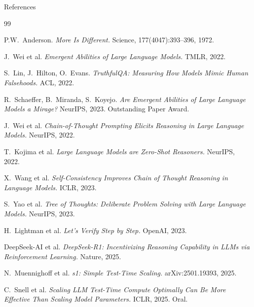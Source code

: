\documentclass[aspectratio=169, 12pt, xcolor=dvipsnames]{beamer}
\begin{document}
\begin{frame}[allowframebreaks]{References}
  \footnotesize
  \begin{thebibliography}{99}

    P.W.\ Anderson.
    \newblock \emph{More Is Different.}
    \newblock Science, 177(4047):393--396, 1972.

    J.\ Wei et al.
    \newblock \emph{Emergent Abilities of Large Language Models.}
    \newblock TMLR, 2022.

    S.\ Lin, J.\ Hilton, O.\ Evans.
    \newblock \emph{TruthfulQA: Measuring How Models Mimic Human Falsehoods.}
    \newblock ACL, 2022.

    R.\ Schaeffer, B.\ Miranda, S.\ Koyejo.
    \newblock \emph{Are Emergent Abilities of Large Language Models a Mirage?}
    \newblock NeurIPS, 2023. Outstanding Paper Award.

    J.\ Wei et al.
    \newblock \emph{Chain-of-Thought Prompting Elicits Reasoning in Large Language Models.}
    \newblock NeurIPS, 2022.

    T.\ Kojima et al.
    \newblock \emph{Large Language Models are Zero-Shot Reasoners.}
    \newblock NeurIPS, 2022.

    X.\ Wang et al.
    \newblock \emph{Self-Consistency Improves Chain of Thought Reasoning in Language Models.}
    \newblock ICLR, 2023.

    S.\ Yao et al.
    \newblock \emph{Tree of Thoughts: Deliberate Problem Solving with Large Language Models.}
    \newblock NeurIPS, 2023.

    H.\ Lightman et al.
    \newblock \emph{Let's Verify Step by Step.}
    \newblock OpenAI, 2023.

    DeepSeek-AI et al.
    \newblock \emph{DeepSeek-R1: Incentivizing Reasoning Capability in LLMs via Reinforcement Learning.}
    \newblock Nature, 2025.

    N.\ Muennighoff et al.
    \newblock \emph{s1: Simple Test-Time Scaling.}
    \newblock arXiv:2501.19393, 2025.

    C.\ Snell et al.
    \newblock \emph{Scaling LLM Test-Time Compute Optimally Can Be More Effective Than Scaling Model Parameters.}
    \newblock ICLR, 2025. Oral.

  \end{thebibliography}
\end{frame}
\end{document}
